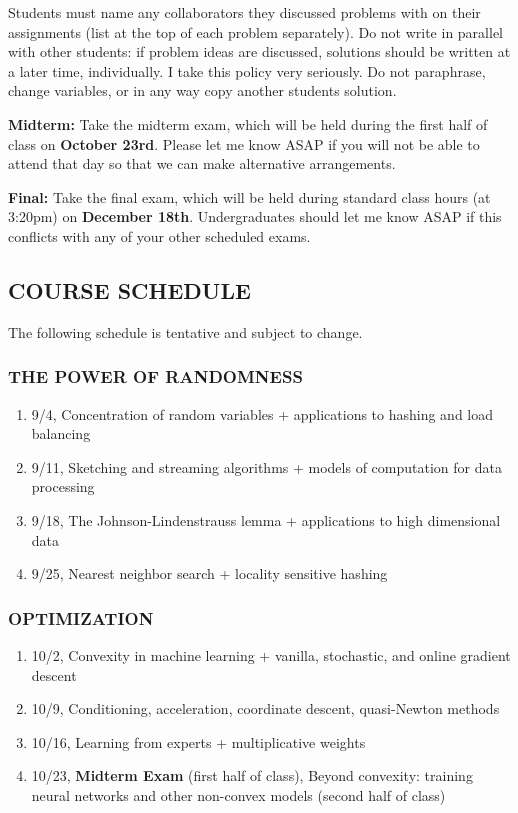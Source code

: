 \documentclass[10pt]{article}
\begin{document}
Students must name any collaborators they discussed problems with on their assignments (list at the top of each problem separately). Do not write in parallel with other students: if problem ideas are discussed, solutions should be written at a later time, individually. I take this policy very seriously. Do not paraphrase, change variables, or in any way copy another students solution. 
	
\medskip\noindent\textbf{Midterm:} Take the midterm exam, which will be held during the first half of class on \textbf{October 23rd}. Please let me know ASAP if you will not be able to attend that day so that we can make alternative arrangements.
	
\medskip\noindent\textbf{Final:} Take the final exam, which will be held during standard class hours (at 3:20pm) on \textbf{December 18th}. Undergraduates should let me know ASAP if this conflicts with any of your other scheduled exams. 


\subsection{COURSE SCHEDULE}
The following schedule is tentative and subject to change.
\subsubsection{THE POWER OF RANDOMNESS}
\begin{enumerate}\itemsep0em 
	\item 9/4, Concentration of random variables + applications to hashing and load balancing		
	\item 9/11, Sketching and streaming algorithms + models of computation for data processing
	\item 9/18, The Johnson-Lindenstrauss lemma + applications to high dimensional data		
	\item 9/25, Nearest neighbor search + locality sensitive hashing
\end{enumerate}

\subsubsection{OPTIMIZATION}
\begin{enumerate}\itemsep0em 
	\setcounter{enumi}{3}
	\item 10/2,	Convexity in machine learning + vanilla, stochastic, and online gradient descent		
	\item 10/9,	Conditioning, acceleration, coordinate descent, quasi-Newton methods		
	\item 10/16, Learning from experts + multiplicative weights		
	\item 10/23, \textbf{Midterm Exam} (first half of class), Beyond convexity: training neural networks and other non-convex models (second half of class)
\end{enumerate}
\end{document}
